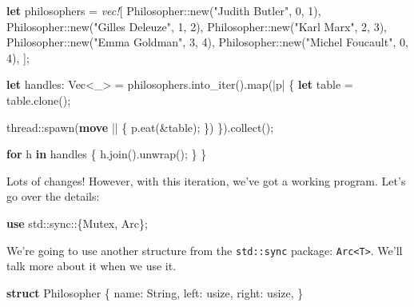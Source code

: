 \documentclass[a4paper,]{book}
\newenvironment{Shaded}{\begin{snugshade}}{\end{snugshade}}
\newcommand{\KeywordTok}[1]{\textcolor[rgb]{0.13,0.29,0.53}{\textbf{{#1}}}}
\newcommand{\DataTypeTok}[1]{\textcolor[rgb]{0.13,0.29,0.53}{{#1}}}
\newcommand{\DecValTok}[1]{\textcolor[rgb]{0.00,0.00,0.81}{{#1}}}
\newcommand{\StringTok}[1]{\textcolor[rgb]{0.31,0.60,0.02}{{#1}}}
\newcommand{\PreprocessorTok}[1]{\textcolor[rgb]{0.56,0.35,0.01}{\textit{{#1}}}}
\newcommand{\NormalTok}[1]{{#1}}
\begin{document}
\begin{Shaded}
\begin{Highlighting}[]
    \KeywordTok{let} \NormalTok{philosophers = }\PreprocessorTok{vec!}\NormalTok{[}
        \NormalTok{Philosopher::new(}\StringTok{"Judith Butler"}\NormalTok{, }\DecValTok{0}\NormalTok{, }\DecValTok{1}\NormalTok{),}
        \NormalTok{Philosopher::new(}\StringTok{"Gilles Deleuze"}\NormalTok{, }\DecValTok{1}\NormalTok{, }\DecValTok{2}\NormalTok{),}
        \NormalTok{Philosopher::new(}\StringTok{"Karl Marx"}\NormalTok{, }\DecValTok{2}\NormalTok{, }\DecValTok{3}\NormalTok{),}
        \NormalTok{Philosopher::new(}\StringTok{"Emma Goldman"}\NormalTok{, }\DecValTok{3}\NormalTok{, }\DecValTok{4}\NormalTok{),}
        \NormalTok{Philosopher::new(}\StringTok{"Michel Foucault"}\NormalTok{, }\DecValTok{0}\NormalTok{, }\DecValTok{4}\NormalTok{),}
    \NormalTok{];}

    \KeywordTok{let} \NormalTok{handles: }\DataTypeTok{Vec}\NormalTok{<_> = philosophers.into_iter().map(|p| \{}
        \KeywordTok{let} \NormalTok{table = table.clone();}

        \NormalTok{thread::spawn(}\KeywordTok{move} \NormalTok{|| \{}
            \NormalTok{p.eat(&table);}
        \NormalTok{\})}
    \NormalTok{\}).collect();}

    \KeywordTok{for} \NormalTok{h }\KeywordTok{in} \NormalTok{handles \{}
        \NormalTok{h.join().unwrap();}
    \NormalTok{\}}
\NormalTok{\}}
\end{Highlighting}
\end{Shaded}

Lots of changes! However, with this iteration, we've got a working
program. Let's go over the details:

\begin{Shaded}
\begin{Highlighting}[]
\KeywordTok{use} \NormalTok{std::sync::\{Mutex, Arc\};}
\end{Highlighting}
\end{Shaded}

We're going to use another structure from the \texttt{std::sync}
package: \texttt{Arc\textless{}T\textgreater{}}. We'll talk more about
it when we use it.

\begin{Shaded}
\begin{Highlighting}[]
\KeywordTok{struct} \NormalTok{Philosopher \{}
    \NormalTok{name: }\DataTypeTok{String}\NormalTok{,}
    \NormalTok{left: }\DataTypeTok{usize}\NormalTok{,}
    \NormalTok{right: }\DataTypeTok{usize}\NormalTok{,}
\NormalTok{\}}
\end{Highlighting}
\end{Shaded}
\end{document}
